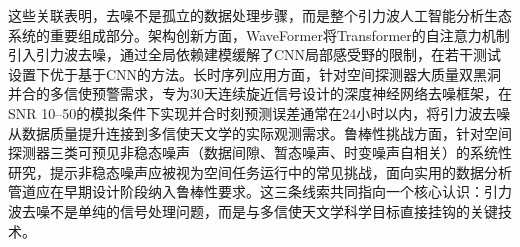 这些关联表明，去噪不是孤立的数据处理步骤，而是整个引力波人工智能分析生态系统的重要组成部分。架构创新方面，WaveFormer将Transformer的自注意力机制引入引力波去噪，通过全局依赖建模缓解了CNN局部感受野的限制，在若干测试设置下优于基于CNN的方法。长时序列应用方面，针对空间探测器大质量双黑洞并合的多信使预警需求，专为30天连续旋近信号设计的深度神经网络去噪框架，在SNR 10--50的模拟条件下实现并合时刻预测误差通常在24小时以内，将引力波去噪从数据质量提升连接到多信使天文学的实际观测需求。鲁棒性挑战方面，针对空间探测器三类可预见非稳态噪声（数据间隙、暂态噪声、时变噪声自相关）的系统性研究，提示非稳态噪声应被视为空间任务运行中的常见挑战，面向实用的数据分析管道应在早期设计阶段纳入鲁棒性要求。这三条线索共同指向一个核心认识：引力波去噪不是单纯的信号处理问题，而是与多信使天文学科学目标直接挂钩的关键技术。
